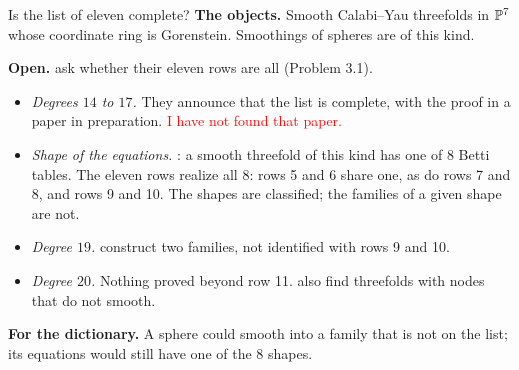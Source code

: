 \begin{frame}{Is the list of eleven complete?}
\small
\textbf{The objects.} Smooth Calabi--Yau threefolds in \(\mathbb P^7\) whose coordinate ring is Gorenstein. Smoothings of spheres are of this kind.
\par
\textbf{Open.} \cite{CGKK} ask whether their eleven rows are all (Problem 3.1).
\begin{itemize}
\setlength{\itemsep}{1pt}
\item \emph{Degrees \(14\) to \(17\).} They announce that the list is complete, with the proof in a paper in preparation. \textcolor{red}{I have not found that paper.}
\item \emph{Shape of the equations.} \cite{SSY}: a smooth threefold of this kind has one of \(8\) Betti tables. The eleven rows realize all \(8\): rows 5 and 6 share one, as do rows 7 and 8, and rows 9 and 10. The shapes are classified; the families of a given shape are not.
\item \emph{Degree \(19\).} \cite{QQ} construct two families, not identified with rows 9 and 10.
\item \emph{Degree \(20\).} Nothing proved beyond row 11. \cite{QQ} also find threefolds with nodes that do not smooth.
\end{itemize}
\textbf{For the dictionary.} A sphere could smooth into a family that is not on the list; its equations would still have one of the \(8\) shapes.
\end{frame}

